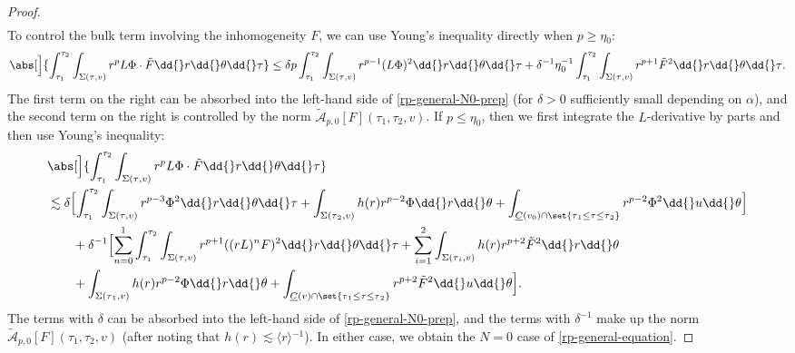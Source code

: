 \documentclass[10pt, reqno]{amsart}
\begin{document}
\begin{proof}
\begin{equation}
\begin{split}
\end{split}
\end{equation}
To control the bulk term involving the inhomogeneity \(F\), we can use Young's
inequality directly when \(p \ge  \eta{}_0\):
\begin{equation}
\abs[\Big]{\int_{\tau_1}^{\tau_2} \int _{\Sigma{}(\tau{},v)} r^pL\Phi{}\cdot \tilde{F} \dd{}r\dd{}\theta{}\dd{}\tau{}}\le \delta{}p\int_{\tau_1}^{\tau_2} \int _{\Sigma{}(\tau{},v)} r^{p-1}(L\Phi{})^2 \dd{}r\dd{}\theta{}\dd{}\tau{} + \delta{}^{-1}\eta{}_0^{-1}\int_{\tau_1}^{\tau_2} \int _{\Sigma{}(\tau{},v)} r^{p+1}\tilde{F}^2 \dd{}r\dd{}\theta{}\dd{}\tau{}.
\end{equation}
The first term on the right can be absorbed into the left-hand side of
\cref{rp-general-N0-prep} (for \(\delta{} > 0\) sufficiently small depending on
\(\alpha{}\)), and the second term on the right is controlled by the norm
\(\tilde{\mathcal{A}}_{p,0}[F](\tau_1,\tau{}_2,v)\). If \(p\le \eta_0\), then we first
integrate the \(L\)-derivative by parts and then use Young's inequality:
\begin{equation}
\begin{split}
&\abs[\Big]{\int_{\tau_1}^{\tau_2} \int _{\Sigma{}(\tau{},v)} r^pL\Phi{}\cdot \tilde{F} \dd{}r\dd{}\theta{}\dd{}\tau{}} \\
&\lesssim \delta{}\Bigl[\int_{\tau_1}^{\tau_2} \int _{\Sigma{}(\tau{},v)} r^{p-3}\Phi^2 \dd{}r\dd{}\theta{}\dd{}\tau{} + \int _{\Sigma{}(\tau{}_2,v)} h(r)r^{p-2}\Phi{}\dd{}r\dd{}\theta{} + \int _{\underline{C}(v_0)\cap \set{\tau{}_1\le \tau{}\le \tau{}_2}}r^{p-2}\Phi{}^2\dd{}u\dd{}\theta{} \Bigr] \\
&\qquad + \delta{}^{-1}\Bigl[\sum_{n=0}^1\int_{\tau_1}^{\tau_2} \int _{\Sigma{}(\tau{},v)} r^{p+1}((rL)^nF)^2 \dd{}r\dd{}\theta{}\dd{}\tau{}+ \sum_{i=1}^2 \int _{\Sigma{}(\tau{}_i,v)} h(r)r^{p+2}\tilde{F}^2\dd{}r\dd{}\theta{} \\
&\qquad + \int _{\Sigma{}(\tau{}_1,v)} h(r)r^{p-2}\Phi{}\dd{}r\dd{}\theta{} + \int _{\underline{C}(v)\cap \set{\tau{}_1\le \tau{}\le \tau{}_2}}r^{p+2}\tilde{F}^2\dd{}u\dd{}\theta{}\Bigr].
\end{split}
\end{equation}
The terms with \(\delta{}\) can be absorbed into the left-hand side of
\cref{rp-general-N0-prep}, and the terms with \(\delta^{-1}\) make up the norm
\(\tilde{\mathcal{A}}_{p,0}[F](\tau{}_1,\tau{}_2,v)\) (after noting that \(h(r)\lesssim
\langle{}r\rangle{}^{-1}\)). In either case, we obtain the \(N = 0\) case of
\cref{rp-general-equation}.


\end{proof}
\end{document}
